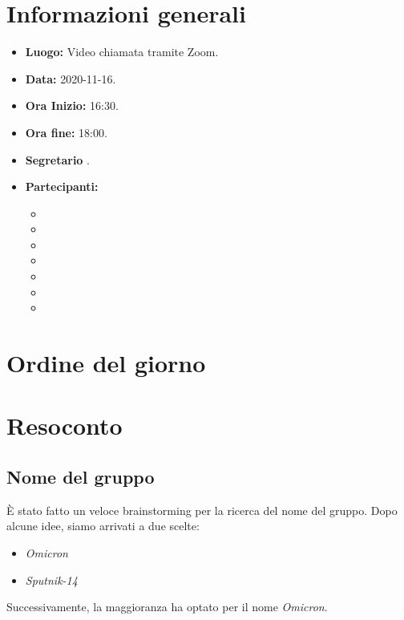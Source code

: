 \documentclass[12pt]{article}
\begin{document}
	
	
	
	
	\newpage
	\tableofcontents
	\newpage
	
	\section{Informazioni generali}
	\begin{itemize}
		\item \textbf{Luogo:} Video chiamata tramite Zoom.
		\item \textbf{Data:} 2020-11-16.
		\item \textbf{Ora Inizio:} 16:30.
		\item \textbf{Ora fine:} 18:00.
		\item \textbf{Segretario} \MB.
		\item \textbf{Partecipanti:}
		\begin{itemize}
			\item \MB
			\item \DF
			\item \FD
			\item \NM
			\item \SB
			\item \GB
			\item \MDI
		\end{itemize}
		
	\end{itemize}
	
	\section{Ordine del giorno}	
		
	
	\newpage
	
	\section{Resoconto}
	\subsection{Nome del gruppo}
	È stato fatto un veloce brainstorming per la ricerca del nome del gruppo. Dopo alcune idee, siamo arrivati a due scelte:
	\begin{itemize}
	\item \textit{Omicron}
	\item \textit{Sputnik-14}
	\end{itemize}
	Successivamente, la maggioranza ha optato per il nome \textit{Omicron}.
	
\end{document}
